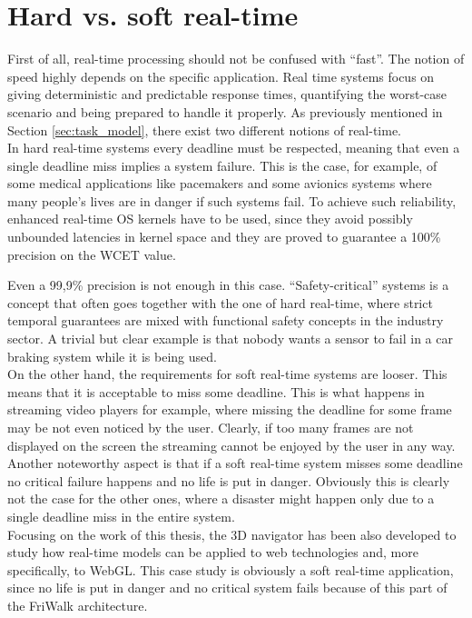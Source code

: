 \section{Hard vs. soft real-time}
First of all, real-time processing should not be confused with ``fast''. The notion
of speed highly depends on the specific application. Real time systems focus on
giving deterministic and predictable response times, quantifying the worst-case
scenario and being prepared to handle it properly. As previously mentioned in Section \ref{sec:task_model}, there exist two different
notions of real-time.\\
In hard real-time systems every deadline must be respected, meaning
that even a single deadline miss implies a system failure. This is the case, for
example, of some medical applications like pacemakers and some avionics systems
where many people's lives are in danger if such systems fail. To achieve such
reliability, enhanced real-time OS kernels have to be used, since they avoid
possibly unbounded latencies in kernel space and they are proved to guarantee
a 100\% precision on the WCET value. 

Even a 99,9\% precision is not
enough in this case. ``Safety-critical'' systems is a concept that often goes
together with the one of hard real-time, where strict temporal guarantees are
mixed with functional safety concepts in the industry sector. A trivial but clear
example is that nobody wants a sensor to fail in a car braking system while
it is being used.\\
On the other hand, the requirements for soft real-time systems are looser. This
means that it is acceptable to miss some deadline.
This is what happens in streaming video players for example, where missing the
deadline for some frame may be not even noticed by the user. Clearly, if too many
frames are not displayed on the screen the streaming cannot be enjoyed by the
user in any way. Another noteworthy aspect is that if a soft real-time system
misses some deadline no critical failure happens and no life is put in danger.
Obviously this is clearly not the case for the other ones, where a disaster
might happen only due to a single deadline miss in the entire system.\\
Focusing on the work of this thesis, the 3D navigator has been also developed 
to study how
real-time models can be applied to web technologies and, more specifically, to
WebGL. This case study is obviously a soft real-time application, since
no life is put in danger and no critical system fails because of this part of
the FriWalk architecture.
